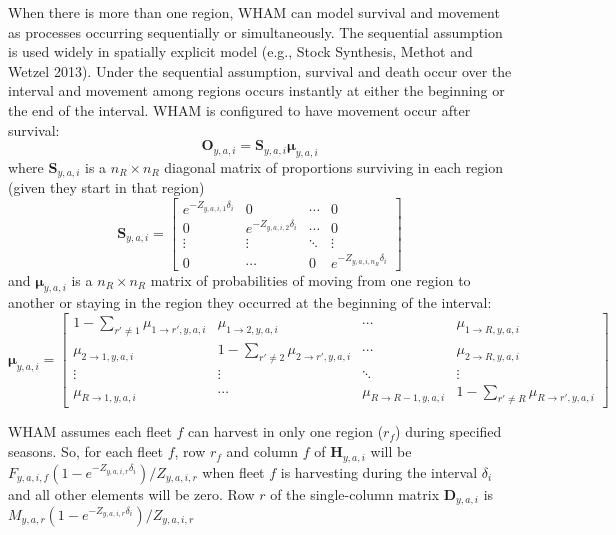 \documentclass[
]{article}
\begin{document}
When there is more than one region, WHAM can model survival and movement
as processes occurring sequentially or simultaneously. The sequential
assumption is used widely in spatially explicit model (e.g., Stock
Synthesis, Methot and Wetzel 2013). Under the sequential assumption,
survival and death occur over the interval and movement among regions
occurs instantly at either the beginning or the end of the interval.
WHAM is configured to have movement occur after survival:
\begin{equation*}
  \mathbf{O}_{y,a,i} = \mathbf{S}_{y,a,i}\boldsymbol{\mu}_{y,a,i}
\end{equation*} where \(\mathbf{S}_{y,a,i}\) is a \(n_R \times n_R\)
diagonal matrix of proportions surviving in each region (given they
start in that region) \begin{equation*}
\mathbf{S}_{y,a,i} = 
  \begin{bmatrix}
    e^{-Z_{y,a,i,1}\delta_i} & 0 & \cdots & 0 \\
    0 & e^{-Z_{y,a,i,2}\delta_i} & \cdots & 0 \\
    \vdots & \vdots & \ddots & \vdots \\
    0 & \cdots & 0 & e^{-Z_{y,a,i,n_R}\delta_i}
  \end{bmatrix}
\end{equation*} and \(\boldsymbol{\mu}_{y,a,i}\) is a \(n_R \times n_R\)
matrix of probabilities of moving from one region to another or staying
in the region they occurred at the beginning of the interval:
\begin{equation*}
\boldsymbol{\mu}_{y,a,i} = 
  \begin{bmatrix}
    1-\sum_{r' \neq 1} \mu_{1\rightarrow r',y,a,i} & \mu_{1\rightarrow 2,y,a,i} & \cdots & \mu_{1\rightarrow R,y,a,i} \\
    \mu_{2\rightarrow 1,y,a,i} & 1-\sum_{r' \neq 2} \mu_{2\rightarrow r',y,a,i} & \cdots & \mu_{2\rightarrow R,y,a,i} \\
    \vdots & \vdots & \ddots & \vdots \\
    \mu_{R\rightarrow 1,y,a,i} & \cdots & \mu_{R\rightarrow R-1,y,a,i} & 1-\sum_{r' \neq R} \mu_{R\rightarrow r',y,a,i}
  \end{bmatrix}
\end{equation*}

WHAM assumes each fleet \(f\) can harvest in only one region (\(r_f\))
during specified seasons. So, for each fleet \(f\), row \(r_f\) and
column \(f\) of \(\mathbf{H}_{y,a,i}\) will be
\(F_{y,a,i,f}\left(1 - e^{-Z_{y,a,i,r}\delta_i}\right)/Z_{y,a,i,r}\)
when fleet \(f\) is harvesting during the interval \(\delta_i\) and all
other elements will be zero. Row \(r\) of the single-column matrix
\(\mathbf{D}_{y,a,i}\) is
\(M_{y,a,r}\left(1 - e^{-Z_{y,a,i,r}\delta_i}\right)/Z_{y,a,i,r}\)
\end{document}
